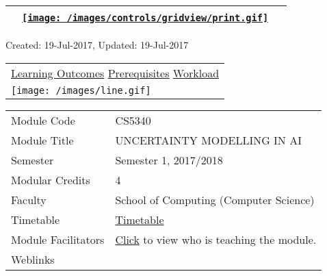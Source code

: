 \hypertarget{ctl00_ctl00_ContentPlaceHolder1_ContentPlaceHolder1_UP}{}
\hypertarget{contentstart}{}
\hypertarget{ctl00_ctl00_ContentPlaceHolder1_ContentPlaceHolder1_pnlMain}{}
\begin{longtable}[]{@{}ll@{}}
\toprule
&
{\href{javascript:PrintThisPage();}{\texttt{[image: /images/controls/gridview/print.gif]}}~~}\tabularnewline
\bottomrule
\end{longtable}

\protect\hypertarget{ctl00_ctl00_ContentPlaceHolder1_ContentPlaceHolder1_LV_UpdateInfo_ctrl0_txtDate}{}{Created:
19-Jul-2017, Updated: 19-Jul-2017}

\begin{longtable}[]{@{}l@{}}
\toprule
\protect\hypertarget{ctl00_ctl00_ContentPlaceHolder1_ContentPlaceHolder1_lblSectionTop}{}{\protect\hyperlink{Learningux5cux2520Outcomes}{Learning
Outcomes} \textbar{} \protect\hyperlink{Prerequisites}{Prerequisites}
\textbar{} \protect\hyperlink{Workload}{Workload}}\tabularnewline
\texttt{[image: /images/line.gif]}\tabularnewline
\bottomrule
\end{longtable}

\hypertarget{ctl00_ctl00_ContentPlaceHolder1_ContentPlaceHolder1_LV_itemPlaceholderContainer}{}
\begin{longtable}[]{@{}ll@{}}
\toprule
\protect\hypertarget{ctl00_ctl00_ContentPlaceHolder1_ContentPlaceHolder1_LV_ctrl0_txtCode}{}{Module
Code} &
\protect\hypertarget{ctl00_ctl00_ContentPlaceHolder1_ContentPlaceHolder1_LV_ctrl0_lcCode}{}{CS5340}\tabularnewline
\protect\hypertarget{ctl00_ctl00_ContentPlaceHolder1_ContentPlaceHolder1_LV_ctrl0_lcCourse}{}{Module
Title} &
\protect\hypertarget{ctl00_ctl00_ContentPlaceHolder1_ContentPlaceHolder1_LV_ctrl0_lcCourseName}{}{UNCERTAINTY
MODELLING IN AI}\tabularnewline
\protect\hypertarget{ctl00_ctl00_ContentPlaceHolder1_ContentPlaceHolder1_LV_ctrl0_lcSemester}{}{Semester}
&
\protect\hypertarget{ctl00_ctl00_ContentPlaceHolder1_ContentPlaceHolder1_LV_ctrl0_lcSem}{}{Semester
1, 2017/2018}\tabularnewline
\protect\hypertarget{ctl00_ctl00_ContentPlaceHolder1_ContentPlaceHolder1_LV_ctrl0_lcModCredit}{}{Modular
Credits} &
\protect\hypertarget{ctl00_ctl00_ContentPlaceHolder1_ContentPlaceHolder1_LV_ctrl0_lcModC}{}{4}\tabularnewline
\protect\hypertarget{ctl00_ctl00_ContentPlaceHolder1_ContentPlaceHolder1_LV_ctrl0_lcFaculty}{}{Faculty}
&
\protect\hypertarget{ctl00_ctl00_ContentPlaceHolder1_ContentPlaceHolder1_LV_ctrl0_lcFac}{}{School
of Computing (Computer Science)}\tabularnewline
\protect\hypertarget{ctl00_ctl00_ContentPlaceHolder1_ContentPlaceHolder1_LV_ctrl0_Label1}{}{Timetable}
&
\protect\hypertarget{ctl00_ctl00_ContentPlaceHolder1_ContentPlaceHolder1_LV_ctrl0_Span1}{}{\href{javascript:void(0);}{Timetable}}\tabularnewline
\protect\hypertarget{ctl00_ctl00_ContentPlaceHolder1_ContentPlaceHolder1_LV_ctrl0_Label6}{}{Module
Facilitators} &
\protect\hypertarget{ctl00_ctl00_ContentPlaceHolder1_ContentPlaceHolder1_LV_ctrl0_Span2}{}{\href{list_lecturers.aspx?CourseID=5d29ef6a-a9e5-4940-ab31-883a8f2a5b45\&ClickFrom=}{Click}
to view who is teaching the module.}\tabularnewline
\protect\hypertarget{ctl00_ctl00_ContentPlaceHolder1_ContentPlaceHolder1_LV_ctrl0_LabelCtrl1}{}{Weblinks}
&\tabularnewline
\bottomrule
\end{longtable}


